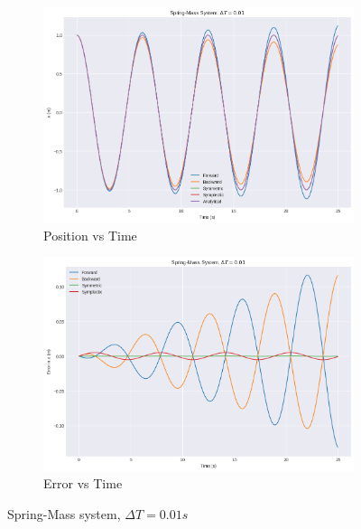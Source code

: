 \documentclass[11pt]{article}
\begin{document}
\begin{figure}[H]
    \centering
    \begin{subfigure}[H]{0.49\linewidth}
        \includegraphics[width=\linewidth]{../sm3.png}
        \caption*{Position vs Time}
    \end{subfigure}
    \begin{subfigure}[H]{0.49\linewidth}
        \includegraphics[width=\linewidth]{../sm4.png}
        \caption*{Error vs Time}
    \end{subfigure}
    \caption*{Spring-Mass system, $\Delta T = 0.01s$}
    \end{figure}
\end{document}
